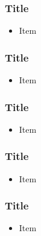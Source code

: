 \documentclass{beamer}\usepackage[]{graphicx}\usepackage[]{color}
\begin{document}
\begin{frame}
\frametitle{Title}
    \begin{itemize}
        \item Item
    \end{itemize}
\end{frame}

\begin{frame}
\frametitle{Title}
    \begin{itemize}
        \item Item
    \end{itemize}
\end{frame}

\begin{frame}
\frametitle{Title}
    \begin{itemize}
        \item Item
    \end{itemize}
\end{frame}

\begin{frame}
\frametitle{Title}
    \begin{itemize}
        \item Item
    \end{itemize}
\end{frame}

\begin{frame}
\frametitle{Title}
    \begin{itemize}
        \item Item
    \end{itemize}
\end{frame}
\end{document}
